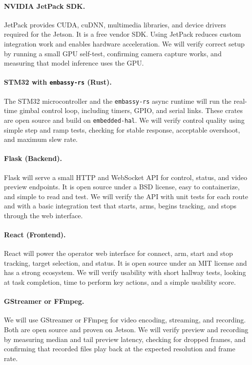 \documentclass[12pt]{article}
\begin{document}
\paragraph{NVIDIA JetPack SDK.}
JetPack provides CUDA, cuDNN, multimedia libraries, and device drivers required for the Jetson. It is a free vendor SDK. Using JetPack reduces custom integration work and enables hardware acceleration. We will verify correct setup by running a small GPU self-test, confirming camera capture works, and measuring that model inference uses the GPU.

\paragraph{STM32 with \texttt{embassy-rs} (Rust).}
The STM32 microcontroller and the \texttt{embassy-rs} async runtime will run the real-time gimbal control loop, including timers, GPIO, and serial links. These crates are open source and build on \texttt{embedded-hal}. We will verify control quality using simple step and ramp tests, checking for stable response, acceptable overshoot, and maximum slew rate.

\paragraph{Flask (Backend).}
Flask will serve a small HTTP and WebSocket API for control, status, and video preview endpoints. It is open source under a BSD license, easy to containerize, and simple to read and test. We will verify the API with unit tests for each route and with a basic integration test that starts, arms, begins tracking, and stops through the web interface.

\paragraph{React (Frontend).}
React will power the operator web interface for connect, arm, start and stop tracking, target selection, and status. It is open source under an MIT license and has a strong ecosystem. We will verify usability with short hallway tests, looking at task completion, time to perform key actions, and a simple usability score.

\paragraph{GStreamer or FFmpeg.}
We will use GStreamer or FFmpeg for video encoding, streaming, and recording. Both are open source and proven on Jetson. We will verify preview and recording by measuring median and tail preview latency, checking for dropped frames, and confirming that recorded files play back at the expected resolution and frame rate.
\end{document}
